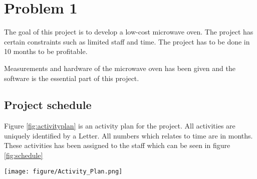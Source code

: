 \chapter{Problem 1}
\label{chp:intro}

The goal of this project is to develop a low-cost microwave oven. 
The project has certain constraints such as limited staff and time. The project has to be done in 10 months to be profitable. 

Measurements and hardware of the microwave oven has been given and the software is the essential part of this project.

\section{Project schedule}
Figure \ref{fig:activityplan} is an activity plan for the project. All activities are uniquely identified by a Letter. All numbers which relates to time are in months. These activities has been assigned to the staff which can be seen in figure \ref{fig:schedule} 
\begin{sidewaysfigure}
	\centering 
	\texttt{[image: figure/Activity\_Plan.png]} 
	\caption{Activity Plan} 
	\label{fig:activityplan}
\end{sidewaysfigure}
